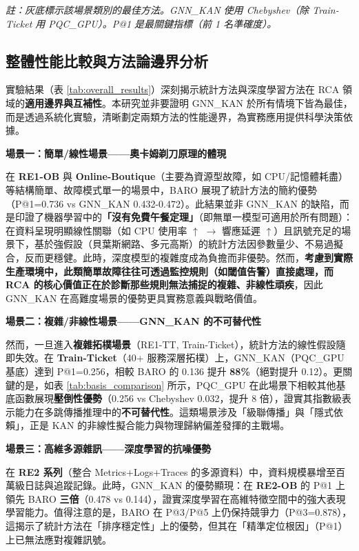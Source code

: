 \documentclass[10pt,a4paper,twocolumn]{article}
\begin{document}
\begin{table}[htbp]
\small \textit{註：灰底標示該場景類別的最佳方法。GNN\_KAN 使用 Chebyshev（除 Train-Ticket 用 PQC\_GPU）。P@1 是最關鍵指標（前 1 名準確度）。}
\end{table}

\subsection{整體性能比較與方法論邊界分析}

實驗結果（表 \ref{tab:overall_results}）深刻揭示統計方法與深度學習方法在 RCA 領域的\textbf{適用邊界與互補性}。本研究並非要證明 GNN\_KAN 於所有情境下皆為最佳，而是透過系統化實驗，清晰劃定兩類方法的性能邊界，為實務應用提供科學決策依據。

\textbf{場景一：簡單/線性場景——奧卡姆剃刀原理的體現}

在 \textbf{RE1-OB} 與 \textbf{Online-Boutique}（主要為資源型故障，如 CPU/記憶體耗盡）等結構簡單、故障模式單一的場景中，BARO 展現了統計方法的簡約優勢（P@1=0.736 vs GNN\_KAN 0.432-0.472）。此結果並非 GNN\_KAN 的缺陷，而是印證了機器學習中的\textbf{「沒有免費午餐定理」}（即無單一模型可適用於所有問題）：在資料呈現明顯線性關聯（如 CPU 使用率 $\uparrow$ $\rightarrow$ 響應延遲 $\uparrow$）且訊號充足的場景下，基於強假設（貝葉斯網路、多元高斯）的統計方法因參數量少、不易過擬合，反而更穩健。此時，深度模型的複雜度成為負擔而非優勢。然而，\textbf{考慮到實際生產環境中，此類簡單故障往往可透過監控規則（如閾值告警）直接處理，而 RCA 的核心價值正在於診斷那些規則無法捕捉的複雜、非線性頑疾}，因此 GNN\_KAN 在高難度場景的優勢更具實務意義與戰略價值。

\textbf{場景二：複雜/非線性場景——GNN\_KAN 的不可替代性}

然而，一旦進入\textbf{複雜拓樸場景}（RE1-TT, Train-Ticket），統計方法的線性假設隨即失效。在 \textbf{Train-Ticket}（40+ 服務深層拓樸）上，GNN\_KAN（PQC\_GPU 基底）達到 P@1=0.256，相較 BARO 的 0.136 提升 \textbf{88\%}（絕對提升 0.12）。更關鍵的是，如表 \ref{tab:basis_comparison} 所示，PQC\_GPU 在此場景下相較其他基底函數展現\textbf{壓倒性優勢}（0.256 vs Chebyshev 0.032，提升 8 倍），證實其指數級表示能力在多跳傳播推理中的\textbf{不可替代性}。這類場景涉及「級聯傳播」與「隱式依賴」，正是 KAN 的非線性擬合能力與物理歸納偏差發揮的主戰場。

\textbf{場景三：高維多源雜訊——深度學習的抗噪優勢}

在 \textbf{RE2 系列}（整合 Metrics+Logs+Traces 的多源資料）中，資料規模暴增至百萬級日誌與追蹤記錄。此時，GNN\_KAN 的優勢顯現：在 \textbf{RE2-OB} 的 P@1 上領先 BARO \textbf{三倍}（0.478 vs 0.144），證實深度學習在高維特徵空間中的強大表現學習能力。值得注意的是，BARO 在 P@3/P@5 上仍保持競爭力（P@3=0.878），這揭示了統計方法在「排序穩定性」上的優勢，但其在「精準定位根因」（P@1）上已無法應對複雜訊號。
\end{document}
